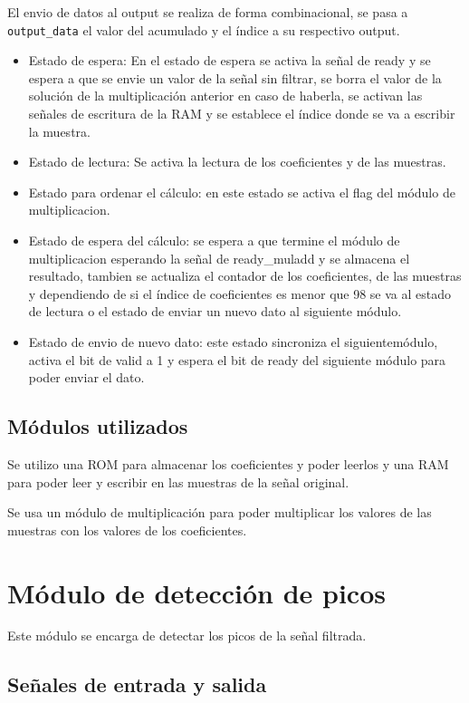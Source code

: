 El envio de datos al output se realiza de forma combinacional, se pasa a \lstinline{output_data} el 
valor del acumulado y el índice a su respectivo output.
\begin{itemize}
    \item Estado de espera: En el estado de espera se activa la señal de ready y se espera a que se envie un valor de la
    señal sin filtrar, se borra el valor de la solución de la multiplicación anterior en caso de haberla, se activan las
    señales de escritura de la RAM y se establece el índice donde se va a escribir la muestra.
    \item Estado de lectura: Se activa la lectura de los coeficientes y de las muestras.
    \item Estado para ordenar el cálculo: en este estado se activa el flag del módulo de multiplicacion.
    \item Estado de espera del cálculo: se espera a que termine el módulo de multiplicacion esperando la señal de ready\_muladd
    y se almacena el resultado, tambien se actualiza el contador de los coeficientes, de las muestras y dependiendo de si el 
    índice de coeficientes es menor que 98 se va al estado de lectura o el estado de enviar un nuevo dato al siguiente módulo.
    \item Estado de envio de nuevo dato: este estado sincroniza el siguientemódulo, activa el bit de valid a 1 y espera el bit
    de ready del siguiente módulo para poder enviar el dato.
\end{itemize}

\subsection{Módulos utilizados}
Se utilizo una ROM para almacenar los coeficientes y poder leerlos y una RAM 
para poder leer y escribir en las muestras de la señal original.

Se usa un módulo de multiplicación para poder multiplicar los valores de las muestras con los valores de los coeficientes.

\section{Módulo de detección de picos}

Este módulo se encarga de detectar los picos de la señal filtrada. 
\subsection{Señales de entrada y salida}

